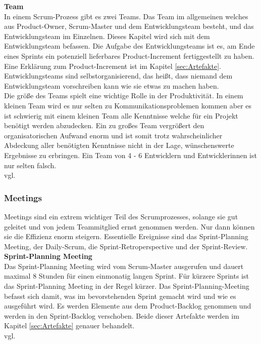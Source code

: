 			\textbf{Team} \\
			In einem Scrum-Prozess gibt es zwei Teams. Das Team im allgemeinen welches aus Product-Owner, Scrum-Master und dem Entwicklungsteam besteht, und das Entwicklungsteam im Einzelnen. Dieses Kapitel wird sich mit dem Entwicklungsteam befassen. Die Aufgabe des Entwicklungsteams ist es, am Ende eines Sprints ein potenziell lieferbares Product-Increment fertiggestellt zu haben. Eine Erklärung zum Product-Increment ist im Kapitel \ref{sec:Artefakte}. Entwicklungsteams sind selbstorganisierend, das heißt, dass niemand dem Entwicklungsteam vorschreiben kann wie sie etwas zu machen haben.\\
			Die größe des Teams spielt eine wichtige Rolle in der Produktivität. In einem kleinen Team wird es nur selten zu Kommunikationsproblemen kommen aber es ist schwierig mit einem kleinen Team alle Kenntnisse welche für ein Projekt benötigt werden abzudecken. Ein zu großes Team vergrößert den organisatorischen Aufwand enorm und ist somit trotz wahrscheinlicher Abdeckung aller benötigten Kenntnisse nicht in der Lage, wünschenswerte Ergebnisse zu erbringen. Ein Team von 4 - 6 Entwicklern und Entwicklerinnen ist nur selten falsch.\\vgl. \textcite{ScrumTeam} \\
			
		
	\subsubsection{Meetings}
	\label{sec:Meetings}
		Meetings sind ein extrem wichtiger Teil des Scrumprozesses, solange sie gut geleitet und von jedem Teammitglied ernst genommen werden. Nur dann können sie die Effizienz enorm steigern. Essentielle Ereignisse sind das Sprint-Planning Meeting, der Daily-Scrum, die Sprint-Retroperspective und der Sprint-Review.  \\
		
		\textbf{Sprint-Planning Meeting} \\
		Das Sprint-Planning Meeting wird vom Scrum-Master ausgerufen und dauert maximal 8 Stunden für einen einmonatig langen Sprint. Für kürzere Sprints ist das Sprint-Planning Meeting in der Regel kürzer. Das Sprint-Planning-Meeting befasst sich damit, was im bevorstehenden Sprint gemacht wird und wie es ausgeführt wird. Es werden Elemente aus dem Product-Backlog genommen und werden in den Sprint-Backlog verschoben. Beide dieser Artefakte werden im Kapitel \ref{sec:Artefakte} genauer behandelt.\\vgl. \textcite{ScrumSprint-Planning} \\
		
